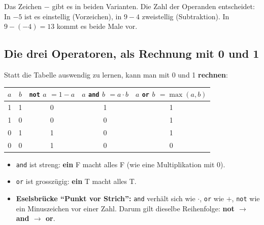 \begin{merke}
  Das Zeichen $-$ gibt es in beiden Varianten. Die Zahl der Operanden entscheidet:
  In $-5$ ist es einstellig (Vorzeichen), in $9 - 4$ zweistellig (Subtraktion).
  In $9 - (-4) = 13$ kommt es beide Male vor.
\end{merke}

\subsection*{Die drei Operatoren, als Rechnung mit 0 und 1}
Statt die Tabelle auswendig zu lernen, kann man mit 0 und 1 \textbf{rechnen}:

\begin{center}
  \renewcommand{\arraystretch}{1.2}
  \begin{tabular}{cc|c|c|c}
    \toprule
    $a$ & $b$ & \texttt{not} $a$ \;$= 1 - a$ & $a$ \texttt{and} $b$ \;$= a \cdot b$ & $a$ \texttt{or} $b$ \;$= \max(a, b)$ \\
    \midrule
    1 & 1 & 0 & 1 & 1 \\
    1 & 0 & 0 & 0 & 1 \\
    0 & 1 & 1 & 0 & 1 \\
    0 & 0 & 1 & 0 & 0 \\
    \bottomrule
  \end{tabular}
\end{center}

\begin{merke}
  \begin{itemize}[nosep]
    \item \texttt{and} ist streng: \textbf{ein} F macht alles F (wie eine Multiplikation mit 0).
    \item \texttt{or} ist grosszügig: \textbf{ein} T macht alles T.
    \item \textbf{Eselsbrücke \enquote{Punkt vor Strich}:} \texttt{and} verhält sich wie $\cdot$,
          \texttt{or} wie $+$, \texttt{not} wie ein Minuszeichen vor einer Zahl.
          Darum gilt dieselbe Reihenfolge: \textbf{not $\to$ and $\to$ or}.
  \end{itemize}
\end{merke}

